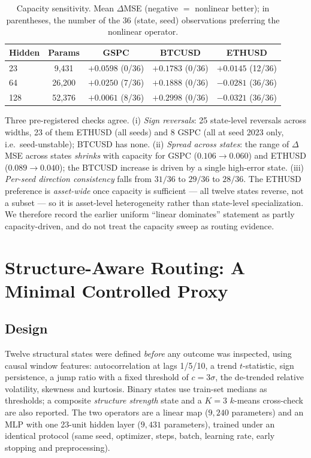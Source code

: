 \documentclass[conference]{IEEEtran}
\begin{document}
\begin{table}[!t]
\caption{Capacity sensitivity. Mean $\Delta$MSE (negative $=$ nonlinear better); in parentheses,
the number of the 36 (state, seed) observations preferring the nonlinear operator.}
\label{tab:cap}
\centering
\small
\begin{tabular}{@{}lcccc@{}}
\toprule
Hidden & Params & GSPC & BTCUSD & ETHUSD \\
\midrule
23  & 9{,}431  & $+0.0598$ (0/36) & $+0.1783$ (0/36) & $+0.0145$ (12/36) \\
64  & 26{,}200 & $+0.0250$ (7/36) & $+0.1888$ (0/36) & $\mathbf{-0.0281}$ (36/36) \\
128 & 52{,}376 & $+0.0061$ (8/36) & $+0.2998$ (0/36) & $\mathbf{-0.0321}$ (36/36) \\
\bottomrule
\end{tabular}
\end{table}

Three pre-registered checks agree. (i) \emph{Sign reversals}: 25 state-level reversals across
widths, 23 of them ETHUSD (all seeds) and 8 GSPC (all at seed 2023 only, i.e.\ seed-unstable);
BTCUSD has none. (ii) \emph{Spread across states}: the range of $\Delta$MSE across states
\emph{shrinks} with capacity for GSPC ($0.106\to0.060$) and ETHUSD ($0.089\to0.040$); the BTCUSD
increase is driven by a single high-error state. (iii) \emph{Per-seed direction consistency} falls
from $31/36$ to $29/36$ to $28/36$. The ETHUSD preference is \emph{asset-wide} once capacity is
sufficient --- all twelve states reverse, not a subset --- so it is asset-level heterogeneity
rather than state-level specialization. We therefore record the earlier uniform ``linear dominates''
statement as partly capacity-driven, and do not treat the capacity sweep as routing evidence.

\section{Structure-Aware Routing: A Minimal Controlled Proxy}
\label{sec:routing}
\subsection{Design}
Twelve structural states were defined \emph{before} any outcome was inspected, using causal
window features: autocorrelation at lags 1/5/10, a trend $t$-statistic, sign persistence, a jump
ratio with a fixed threshold of $c=3\sigma$, the de-trended relative volatility, skewness and
kurtosis. Binary states use train-set medians as thresholds; a composite \emph{structure strength}
state and a $K{=}3$ $k$-means cross-check are also reported. The two operators are a linear map
($9{,}240$ parameters) and an MLP with one 23-unit hidden layer ($9{,}431$ parameters), trained
under an identical protocol (same seed, optimizer, steps, batch, learning rate, early stopping and
preprocessing).
\end{document}
